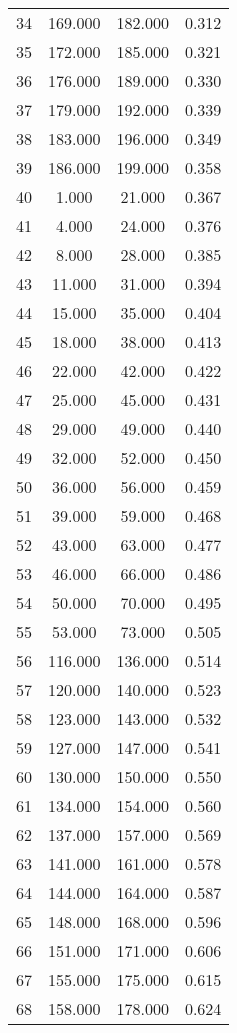 \begin{tabular}{cccc}
  34 & 169.000 & 182.000 & 0.312 \\ 
  35 & 172.000 & 185.000 & 0.321 \\ 
  36 & 176.000 & 189.000 & 0.330 \\ 
  37 & 179.000 & 192.000 & 0.339 \\ 
  38 & 183.000 & 196.000 & 0.349 \\ 
  39 & 186.000 & 199.000 & 0.358 \\ 
  40 & 1.000 & 21.000 & 0.367 \\ 
  41 & 4.000 & 24.000 & 0.376 \\ 
  42 & 8.000 & 28.000 & 0.385 \\ 
  43 & 11.000 & 31.000 & 0.394 \\ 
  44 & 15.000 & 35.000 & 0.404 \\ 
  45 & 18.000 & 38.000 & 0.413 \\ 
  46 & 22.000 & 42.000 & 0.422 \\ 
  47 & 25.000 & 45.000 & 0.431 \\ 
  48 & 29.000 & 49.000 & 0.440 \\ 
  49 & 32.000 & 52.000 & 0.450 \\ 
  50 & 36.000 & 56.000 & 0.459 \\ 
  51 & 39.000 & 59.000 & 0.468 \\ 
  52 & 43.000 & 63.000 & 0.477 \\ 
  53 & 46.000 & 66.000 & 0.486 \\ 
  54 & 50.000 & 70.000 & 0.495 \\ 
  55 & 53.000 & 73.000 & 0.505 \\ 
  56 & 116.000 & 136.000 & 0.514 \\ 
  57 & 120.000 & 140.000 & 0.523 \\ 
  58 & 123.000 & 143.000 & 0.532 \\ 
  59 & 127.000 & 147.000 & 0.541 \\ 
  60 & 130.000 & 150.000 & 0.550 \\ 
  61 & 134.000 & 154.000 & 0.560 \\ 
  62 & 137.000 & 157.000 & 0.569 \\ 
  63 & 141.000 & 161.000 & 0.578 \\ 
  64 & 144.000 & 164.000 & 0.587 \\ 
  65 & 148.000 & 168.000 & 0.596 \\ 
  66 & 151.000 & 171.000 & 0.606 \\ 
  67 & 155.000 & 175.000 & 0.615 \\ 
  68 & 158.000 & 178.000 & 0.624 \\ 

\end{tabular}
